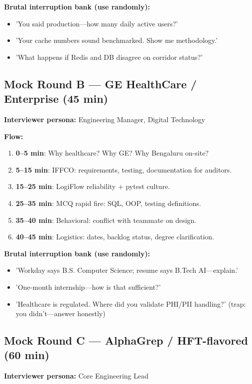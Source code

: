 \documentclass[9pt,a4paper]{article}
\begin{document}
\textbf{Brutal interruption bank (use randomly):}
\begin{itemize}
  \item 'You said production---how many daily active users?'
  \item 'Your cache numbers sound benchmarked. Show me methodology.'
  \item 'What happens if Redis and DB disagree on corridor status?'
\end{itemize}

\subsection{Mock Round B --- GE HealthCare / Enterprise (45 min)}
\textbf{Interviewer persona:} Engineering Manager, Digital Technology

\textbf{Flow:}
\begin{enumerate}
  \item \textbf{0--5 min}: Why healthcare? Why GE? Why Bengaluru on-site?
  \item \textbf{5--15 min}: IFFCO: requirements, testing, documentation for auditors.
  \item \textbf{15--25 min}: LogiFlow reliability + pytest culture.
  \item \textbf{25--35 min}: MCQ rapid fire: SQL, OOP, testing definitions.
  \item \textbf{35--40 min}: Behavioral: conflict with teammate on design.
  \item \textbf{40--45 min}: Logistics: dates, backlog status, degree clarification.
\end{enumerate}

\textbf{Brutal interruption bank (use randomly):}
\begin{itemize}
  \item 'Workday says B.S. Computer Science; resume says B.Tech AI---explain.'
  \item 'One-month internship---how is that sufficient?'
  \item 'Healthcare is regulated. Where did you validate PHI/PII handling?' (trap: you didn't---answer honestly)
\end{itemize}

\subsection{Mock Round C --- AlphaGrep / HFT-flavored (60 min)}
\textbf{Interviewer persona:} Core Engineering Lead
\end{document}

